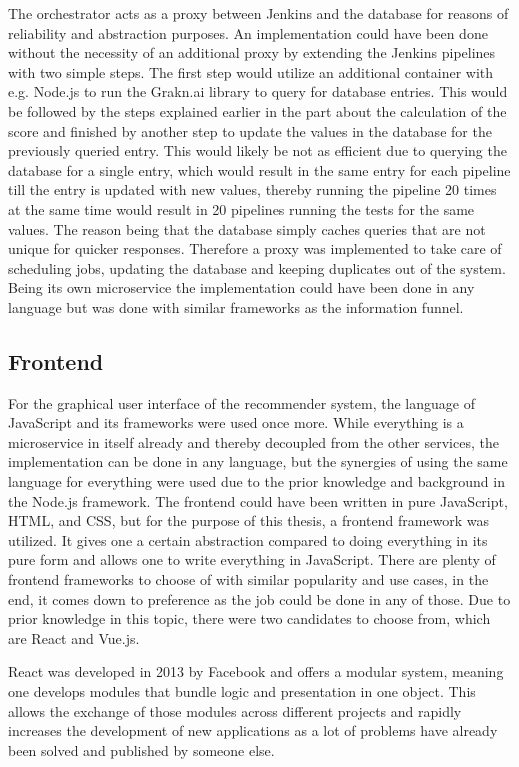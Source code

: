 The orchestrator acts as a proxy between Jenkins and the database for reasons of reliability and abstraction purposes.
An implementation could have been done without the necessity of an additional proxy by extending the Jenkins pipelines with two simple steps. The first step would utilize an additional container with e.g. Node.js to run the Grakn.ai library to query for database entries. This would be followed by the steps explained earlier in the part about the calculation of the score and finished by another step to update the values in the database for the previously queried entry. This would likely be not as efficient due to querying the database for a single entry, which would result in the same entry for each pipeline till the entry is updated with new values, thereby running the pipeline 20 times at the same time would result in 20 pipelines running the tests for the same values. The reason being that the database simply caches queries that are not unique for quicker responses. Therefore a proxy was implemented to take care of scheduling jobs, updating the database and keeping duplicates out of the system. Being its own microservice the implementation could have been done in any language but was done with similar frameworks as the information funnel.
\subsection{Frontend}
For the graphical user interface of the recommender system, the language of JavaScript and its frameworks were used once more. While everything is a microservice in itself already and thereby decoupled from the other services, the implementation can be done in any language, but the synergies of using the same language for everything were used due to the prior knowledge and background in the Node.js framework.
The frontend could have been written in pure JavaScript, HTML, and CSS, but for the purpose of this thesis, a frontend framework was utilized. It gives one a certain abstraction compared to doing everything in its pure form and allows one to write everything in JavaScript. There are plenty of frontend frameworks to choose of with similar popularity and use cases, in the end, it comes down to preference as the job could be done in any of those. Due to prior knowledge in this topic, there were two candidates to choose from, which are React and Vue.js.

React was developed in 2013 by Facebook and offers a modular system, meaning one develops modules that bundle logic and presentation in one object. This allows the exchange of those modules across different projects and rapidly increases the development of new applications as a lot of problems have already been solved and published by someone else.


